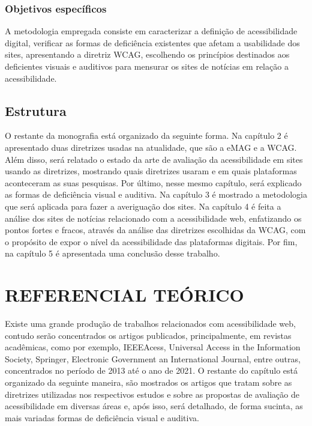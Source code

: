 \documentclass[a4paper]{article}
\begin{document}
\begin{titlepage}
\subsubsection{Objetivos específicos}

A metodologia empregada consiste em caracterizar a definição de acessibilidade digital, verificar as formas de deficiência existentes que afetam a usabilidade dos sites, apresentando a diretriz WCAG, escolhendo os princípios destinados aos deficientes visuais e auditivos para mensurar os sites de notícias em relação a acessibilidade.

\subsection{Estrutura}

O restante da monografia está organizado da seguinte forma.
Na capítulo 2 é apresentado duas diretrizes usadas na atualidade, que são a eMAG e a WCAG. Além disso, será relatado o estado da arte de avaliação da acessibilidade em sites usando as diretrizes, mostrando quais diretrizes usaram e em quais plataformas aconteceram as suas pesquisas. Por último, nesse mesmo capítulo, será explicado as formas de deficiência visual e auditiva.
Na capítulo 3 é mostrado a metodologia que será aplicada para fazer a averiguação dos sites.
Na capítulo 4 é feita a análise dos sites de notícias relacionado com a acessibilidade web, enfatizando os pontos fortes e fracos, através da análise das diretrizes escolhidas da WCAG, com o propósito de expor o nível da acessibilidade das plataformas digitais.
Por fim, na capítulo 5 é apresentada uma conclusão desse trabalho.

\section{REFERENCIAL TEÓRICO}
Existe uma grande produção de trabalhos relacionados com acessibilidade web, contudo serão concentrados os artigos publicados, principalmente, em revistas acadêmicas, como por exemplo, IEEEAcess, Universal Access in the Information Society, Springer, Electronic Government an International
Journal, entre outras, concentrados no período de 2013 até o ano de 2021. O restante do capítulo está organizado da seguinte maneira, são mostrados os artigos que tratam sobre as diretrizes utilizadas nos respectivos estudos e sobre as propostas de avaliação de acessibilidade em diversas áreas e, após isso, será detalhado, de forma sucinta, as mais variadas formas de deficiência visual e auditiva.


\end{titlepage}
\end{document}
